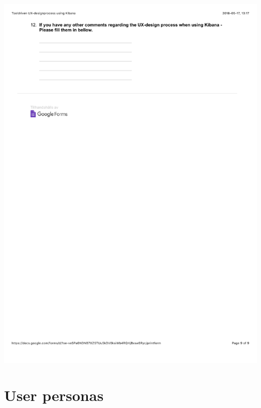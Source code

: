 \documentclass[12pt]{kththesis}
\begin{document}
\begin{appendices}
\includegraphics[width=1\textwidth]{UX_designprocess9.pdf}

\section{User personas}

\end{appendices}
\end{document}
